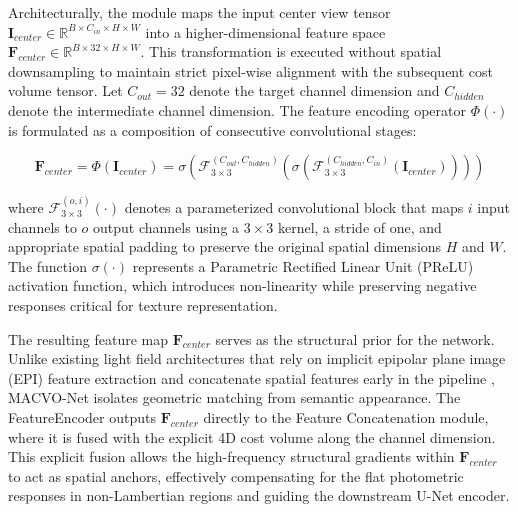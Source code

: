 \documentclass[lettersize,journal]{IEEEtran}
\begin{document}
Architecturally, the module maps the input center view tensor $\mathbf{I}_{center} \in \mathbb{R}^{B \times C_{in} \times H \times W}$ into a higher-dimensional feature space $\mathbf{F}_{center} \in \mathbb{R}^{B \times 32 \times H \times W}$. This transformation is executed without spatial downsampling to maintain strict pixel-wise alignment with the subsequent cost volume tensor. Let $C_{out} = 32$ denote the target channel dimension and $C_{hidden}$ denote the intermediate channel dimension. The feature encoding operator $\Phi(\cdot)$ is formulated as a composition of consecutive convolutional stages:

\begin{equation}
\mathbf{F}_{center} = \Phi(\mathbf{I}_{center}) = \sigma \left( \mathcal{F}_{3 \times 3}^{(C_{out}, C_{hidden})} \left( \sigma \left( \mathcal{F}_{3 \times 3}^{(C_{hidden}, C_{in})} \left( \mathbf{I}_{center} \right) \right) \right) \right)
\end{equation}

where $\mathcal{F}_{3 \times 3}^{(o, i)}(\cdot)$ denotes a parameterized convolutional block that maps $i$ input channels to $o$ output channels using a $3 \times 3$ kernel, a stride of one, and appropriate spatial padding to preserve the original spatial dimensions $H$ and $W$. The function $\sigma(\cdot)$ represents a Parametric Rectified Linear Unit (PReLU) activation function, which introduces non-linearity while preserving negative responses critical for texture representation.

The resulting feature map $\mathbf{F}_{center}$ serves as the structural prior for the network. Unlike existing light field architectures that rely on implicit epipolar plane image (EPI) feature extraction and concatenate spatial features early in the pipeline \cite{heber2018}, MACVO-Net isolates geometric matching from semantic appearance. The FeatureEncoder outputs $\mathbf{F}_{center}$ directly to the Feature Concatenation module, where it is fused with the explicit 4D cost volume along the channel dimension. This explicit fusion allows the high-frequency structural gradients within $\mathbf{F}_{center}$ to act as spatial anchors, effectively compensating for the flat photometric responses in non-Lambertian regions and guiding the downstream U-Net encoder.

\subsection{}
\end{document}
